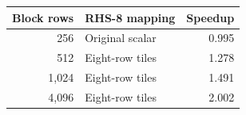 \begin{tabular}{rlr}
\toprule
Block rows & RHS-8 mapping & Speedup \\
\midrule
256 & Original scalar & 0.995 \\
512 & Eight-row tiles & 1.278 \\
1,024 & Eight-row tiles & 1.491 \\
4,096 & Eight-row tiles & 2.002 \\
\bottomrule
\end{tabular}
